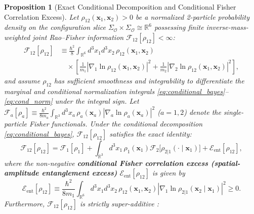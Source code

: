 \documentclass[11pt, a4paper]{article}
\newtheorem{proposition}[theorem]{Proposition}
\theoremstyle{definition}
\begin{document}
\begin{proposition}[Exact Conditional Decomposition and Conditional Fisher Correlation Excess]
\label{prop:fisher_excess}
Let $\rho_{12}(\mathbf{x}_1, \mathbf{x}_2) > 0$ be a normalized 2-particle probability density on the configuration slice $\Sigma_{\mathcal{O}} \times \Sigma_{\mathcal{O}} \cong \mathbb{R}^6$ possessing finite inverse-mass-weighted joint Rao--Fisher information $\mathcal{F}_{12}[\rho_{12}] < \infty$:
\begin{equation}
\label{eq:fisher_2p_main}
\begin{aligned}
\mathcal{F}_{12}[\rho_{12}] &\equiv \frac{\hbar^2}{8} \int_{\mathbb{R}^6} d^3x_1 d^3x_2 \, \rho_{12}(\mathbf{x}_1, \mathbf{x}_2) \\
&\quad \times \left[ \frac{1}{m_1}\left|\nabla_1 \ln\rho_{12}(\mathbf{x}_1, \mathbf{x}_2)\right|^2 + \frac{1}{m_2}\left|\nabla_2 \ln\rho_{12}(\mathbf{x}_1, \mathbf{x}_2)\right|^2 \right],
\end{aligned}
\end{equation}
and assume $\rho_{12}$ has sufficient smoothness and integrability to differentiate the marginal and conditional normalization integrals \eqref{eq:conditional_bayes}--\eqref{eq:cond_norm} under the integral sign. Let $\mathcal{F}_a[\rho_a] \equiv \frac{\hbar^2}{8m_a}\int_{\mathbb{R}^3} d^3x_a\,\rho_a(\mathbf{x}_a)|\nabla_a \ln\rho_a(\mathbf{x}_a)|^2$ ($a=1,2$) denote the single-particle Fisher functionals. Under the conditional decomposition \eqref{eq:conditional_bayes}, $\mathcal{F}_{12}[\rho_{12}]$ satisfies the exact identity:
\begin{equation}
\label{eq:fisher_excess_main}
\mathcal{F}_{12}[\rho_{12}] = \mathcal{F}_1[\rho_1] + \int_{\mathbb{R}^3} d^3x_1\,\rho_1(\mathbf{x}_1)\mathcal{F}_2\big[\rho_{2|1}(\cdot \mid \mathbf{x}_1)\big] + \mathcal{E}_{\text{ent}}[\rho_{12}],
\end{equation}
where the non-negative \textbf{conditional Fisher correlation excess (spatial-amplitude entanglement excess)} $\mathcal{E}_{\text{ent}}[\rho_{12}]$ is given by
\begin{equation}
\label{eq:E_ent_def}
\mathcal{E}_{\text{ent}}[\rho_{12}] \equiv \frac{\hbar^2}{8m_1}\int_{\mathbb{R}^6} d^3x_1 d^3x_2\,\rho_{12}(\mathbf{x}_1, \mathbf{x}_2)\left|\nabla_1 \ln\rho_{2|1}(\mathbf{x}_2 \mid \mathbf{x}_1)\right|^2 \ge 0.
\end{equation}
Furthermore, $\mathcal{F}_{12}[\rho_{12}]$ is strictly super-additive \cite{Carlen1991}:
\begin{equation}

\end{equation}
\end{proposition}
\end{document}
